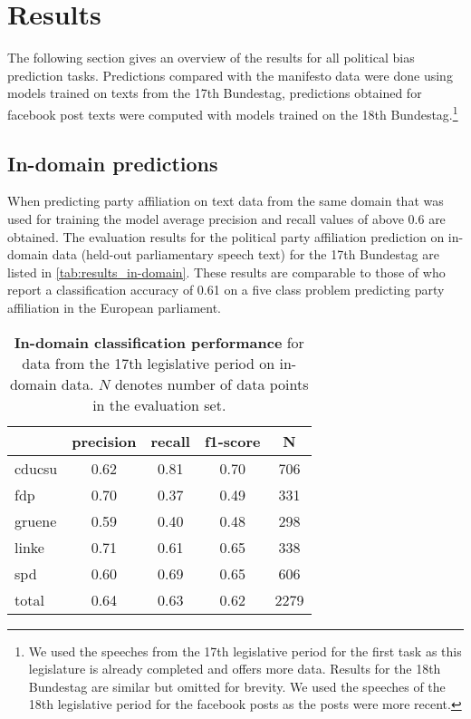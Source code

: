 \documentclass[11pt]{article}
\begin{document}
\section{Results}\label{sec:results}

The following section gives an overview of the results for all political bias prediction tasks. 
Predictions compared with the manifesto data were done using models trained on texts from the 17th Bundestag, predictions obtained for facebook post texts were computed with models trained on the 18th Bundestag.\footnote{We used the speeches from the 17th legislative period for the first task as this legislature is already completed and offers more data. Results for the 18th Bundestag are similar but omitted for brevity. We used the speeches of the 18th legislative period for the facebook posts as the posts were more recent.}

\subsection{In-domain predictions}

When predicting party affiliation on text data from the same domain that was used for training the model average precision and recall values of above 0.6 are obtained. The evaluation results for the political party affiliation prediction on in-domain data (held-out parliamentary speech text) for the 17th Bundestag are listed in \autoref{tab:results_in-domain}.
These results are comparable to those of \cite{Hirst2014} who report a classification accuracy of 0.61 on a five class problem predicting party affiliation in the European parliament.


\begin{table}[t]
\caption{
\label{tab:results_in-domain}
{\bf In-domain classification performance} for data from the 17th legislative period on in-domain data. $N$ denotes number of data points in the evaluation set.
}
\begin{center}
\begin{tabular}{lcccc}
    &         precision    &recall &  f1-score  & N  \\
\hline \hline
       cducsu   &    0.62  &    0.81  &    0.70  &     706\\
        fdp    &   0.70   &   0.37  &    0.49    &   331\\
     gruene &      0.59  &    0.40   &   0.48   &    298\\
      linke    &   0.71   &   0.61  &    0.65    &   338\\
        spd   &    0.60   &   0.69  &    0.65   &    606\\
\hline
 total &      0.64   &   0.63   &   0.62    &  2279 
%
\end{tabular}
\end{center}
\end{table}
\end{document}
